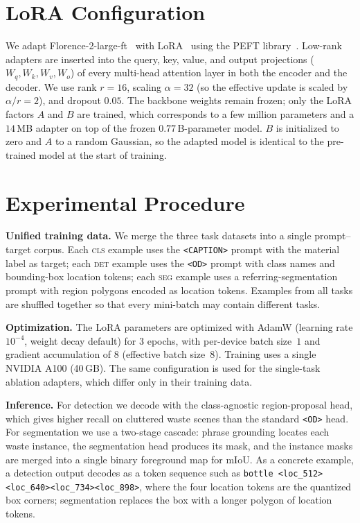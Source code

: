 \documentclass[conference]{IEEEtran}
\begin{document}
\section{LoRA Configuration}
\label{app:lora}
We adapt Florence-2-large-ft~\cite{florence2} with LoRA~\cite{lora} using the
PEFT library~\cite{peft}. Low-rank adapters are inserted into the query, key,
value, and output projections ($W_q,W_k,W_v,W_o$) of every multi-head attention
layer in both the encoder and the decoder. We use rank $r{=}16$, scaling
$\alpha{=}32$ (so the effective update is scaled by $\alpha/r{=}2$), and dropout
$0.05$. The backbone weights remain frozen; only the LoRA factors $A$ and $B$ are
trained, which corresponds to a few million parameters and a $14$\,MB adapter on
top of the frozen $0.77$\,B-parameter model. $B$ is initialized to zero and $A$ to
a random Gaussian, so the adapted model is identical to the pre-trained model at
the start of training.

\section{Experimental Procedure}
\label{app:exp}
\textbf{Unified training data.} We merge the three task datasets into a single
prompt--target corpus. Each \textsc{cls} example uses the \texttt{<CAPTION>}
prompt with the material label as target; each \textsc{det} example uses the
\texttt{<OD>} prompt with class names and bounding-box location tokens; each
\textsc{seg} example uses a referring-segmentation prompt with region polygons
encoded as location tokens. Examples from all tasks are shuffled together so that
every mini-batch may contain different tasks.

\textbf{Optimization.} The LoRA parameters are optimized with AdamW (learning
rate $10^{-4}$, weight decay default) for $3$ epochs, with per-device batch
size~$1$ and gradient accumulation of $8$ (effective batch size~$8$). Training
uses a single NVIDIA A100 (40\,GB). The same configuration is used for the
single-task ablation adapters, which differ only in their training data.

\textbf{Inference.} For detection we decode with the class-agnostic
region-proposal head, which gives higher recall on cluttered waste scenes than
the standard \texttt{<OD>} head. For segmentation we use a two-stage cascade:
phrase grounding locates each waste instance, the segmentation head produces its
mask, and the instance masks are merged into a single binary foreground map for
mIoU. As a concrete example, a detection output decodes as a token sequence such
as \texttt{bottle <loc\_512><loc\_640><loc\_734><loc\_898>}, where the four
location tokens are the quantized box corners; segmentation replaces the box with
a longer polygon of location tokens.
\end{document}
